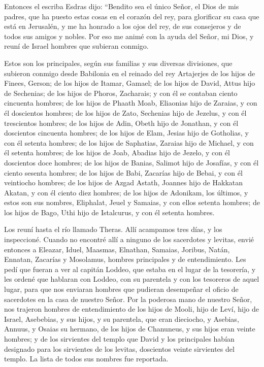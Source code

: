  Entonces el escriba Esdras dijo: ``Bendito sea el único
Señor, el Dios de mis padres, que ha puesto estas cosas en el corazón
del rey, para glorificar su casa que está en Jerusalén, 
y me ha honrado a los ojos del rey, de sus consejeros y de todos sus
amigos y nobles.  Por eso me animé con la ayuda del
Señor, mi Dios, y reuní de Israel hombres que subieran conmigo.

 Estos son los principales, según sus familias y sus
diversas divisiones, que subieron conmigo desde Babilonia en el reinado
del rey Artajerjes  de los hijos de Finees, Gerson; de
los hijos de Itamar, Gamael; de los hijos de David, Attus hijo de
Sechenias;  de los hijos de Phoros, Zacharais; y con él
se contaban ciento cincuenta hombres;  de los hijos de
Phaath Moab, Eliaonias hijo de Zaraias, y con él doscientos hombres;
 de los hijos de Zato, Sechenias hijo de Jezelus, y con
él trescientos hombres; de los hijos de Adin, Obeth hijo de Jonathan, y
con él doscientos cincuenta hombres;  de los hijos de
Elam, Jesias hijo de Gotholias, y con él setenta hombres;
 de los hijos de Saphatias, Zaraias hijo de Michael, y
con él setenta hombres;  de los hijos de Joab, Abadias
hijo de Jezelo, y con él doscientos doce hombres;  de los
hijos de Banias, Salimot hijo de Josafías, y con él ciento sesenta
hombres;  de los hijos de Babi, Zacarías hijo de Bebai, y
con él veintiocho hombres;  de los hijos de Azgad Astath,
Joannes hijo de Hakkatan Akatan, y con él ciento diez hombres;
 de los hijos de Adonikam, los últimos, y estos son sus
nombres, Eliphalat, Jeuel y Samaias, y con ellos setenta hombres;
 de los hijos de Bago, Uthi hijo de Istalcurus, y con él
setenta hombres.

 Los reuní hasta el río llamado Theras. Allí acampamos
tres días, y los inspeccioné.  Cuando no encontré allí a
ninguno de los sacerdotes y levitas,  envié entonces a
Eleazar, Iduel, Maasmas,  Elnathan, Samaias, Joribus,
Natán, Ennatan, Zacarías y Mosolamus, hombres principales y de
entendimiento.  Les pedí que fueran a ver al capitán
Loddeo, que estaba en el lugar de la tesorería,  y les
ordené que hablaran con Loddeo, con su parentela y con los tesoreros de
aquel lugar, para que nos enviaran hombres que pudieran desempeñar el
oficio de sacerdotes en la casa de nuestro Señor.  Por la
poderosa mano de nuestro Señor, nos trajeron hombres de entendimiento de
los hijos de Mooli, hijo de Leví, hijo de Israel, Asebebias, y sus
hijos, y su parentela, que eran dieciocho,  y Asebias,
Annuus, y Osaias su hermano, de los hijos de Chanuneus, y sus hijos eran
veinte hombres;  y de los sirvientes del templo que David
y los principales habían designado para los sirvientes de los levitas,
doscientos veinte sirvientes del templo. La lista de todos sus nombres
fue reportada.

